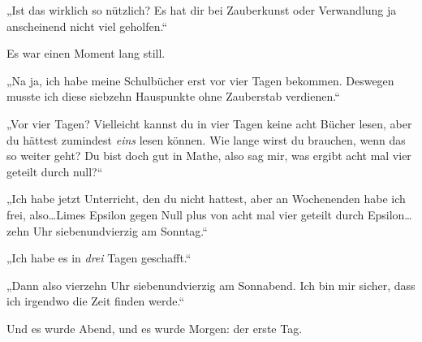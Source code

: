 „Ist das wirklich so nützlich? Es hat dir bei Zauberkunst oder Verwandlung ja anscheinend nicht viel geholfen.“

Es war einen Moment lang still.

„Na ja, ich habe meine Schulbücher erst vor vier Tagen bekommen. Deswegen musste ich diese siebzehn Hauspunkte ohne Zauberstab verdienen.“

„Vor vier Tagen? Vielleicht kannst du in vier Tagen keine acht Bücher lesen, aber du hättest zumindest \emph{eins} lesen können. Wie lange wirst du brauchen, wenn das so weiter geht? Du bist doch gut in Mathe, also sag mir, was ergibt acht mal vier geteilt durch null?“

„Ich habe jetzt Unterricht, den du nicht hattest, aber an Wochenenden habe ich frei, also…Limes Epsilon gegen Null plus von acht mal vier geteilt durch Epsilon…zehn Uhr siebenundvierzig am Sonntag.“

„Ich habe es in \emph{drei} Tagen geschafft.“

„Dann also vierzehn Uhr siebenundvierzig am Sonnabend. Ich bin mir sicher, dass ich irgendwo die Zeit finden werde.“

Und es wurde Abend, und es wurde Morgen: der erste Tag.

